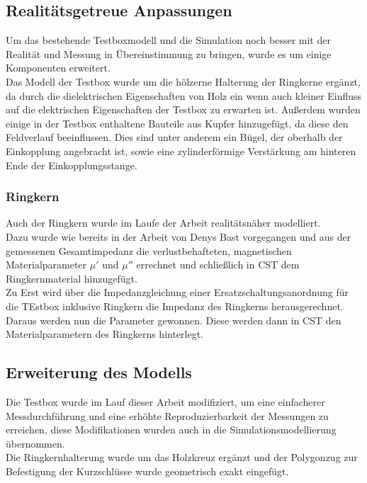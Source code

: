         \subsection{Realitätsgetreue Anpassungen}
        Um das bestehende Testboxmodell und die Simulation noch besser mit der Realität und Messung in Übereinstimmung zu bringen, wurde es um einige Komponenten erweitert.\\
        Das Modell der Testbox wurde um die hölzerne Halterung der Ringkerne ergänzt, da durch die dielektrischen Eigenschaften von Holz ein wenn auch kleiner Einfluss auf die elektrischen Eigenschaften der Testbox zu erwarten ist. Außerdem wurden einige in der Testbox enthaltene Bauteile aus Kupfer hinzugefügt, da diese den Feldverlauf beeinflussen. Dies sind unter anderem ein Bügel, der oberhalb der Einkopplung angebracht ist, sowie eine zylinderförmige Verstärkung am hinteren Ende der Einkopplungsstange.
        
            \subsubsection{Ringkern}
            Auch der Ringkern wurde im Laufe der Arbeit realitätsnäher modelliert.\\
            Dazu wurde wie bereits in der Arbeit von Denys Bast vorgegangen und aus der gemessenen Gesamtimpedanz die verlustbehafteten, magnetischen Materialparameter $\mu'$ und $\mu''$ errechnet und schließlich in CST dem Ringkernmaterial hinzugefügt.\\
            Zu Erst wird über die Impedanzgleichung einer Ersatzschaltungsanordnung für die TEstbox inklusive Ringkern die Impedanz des Ringkerns herausgerechnet. Daraus werden nun die Parameter gewonnen. Diese werden dann in CST den Materialparametern des Ringkerns hinterlegt.
        \subsection{Erweiterung des Modells}
        Die Testbox wurde im Lauf dieser Arbeit modifiziert, um eine einfacherer Messdurchführung und eine erhöhte Reproduzierbarkeit der Messungen zu erreichen, diese Modifikationen wurden auch in die Simulationsmodellierung übernommen.\\
        Die Ringkernhalterung wurde um das Holzkreuz ergänzt und der Polygonzug zur Befestigung der Kurzschlüsse wurde geometrisch exakt eingefügt.\\

